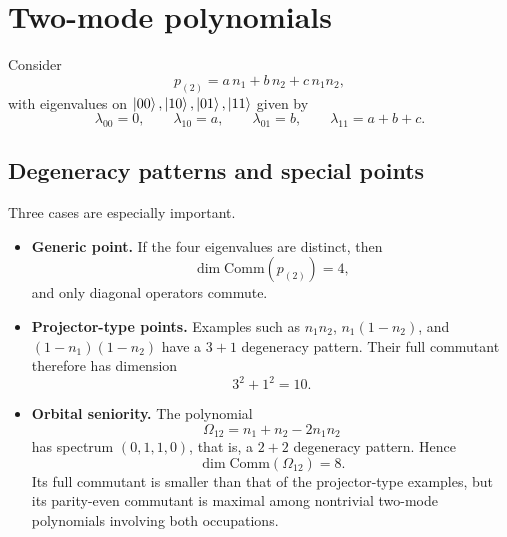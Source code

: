 \documentclass[11pt]{article}
\newcommand{\Comm}{\mathrm{Comm}}
\theoremstyle{definition}
\theoremstyle{remark}
\begin{document}
\section{Two-mode polynomials}
Consider
\begin{equation}
  p_{(2)}=a\,n_1+b\,n_2+c\,n_1n_2,
\end{equation}
with eigenvalues on $\ket{00},\ket{10},\ket{01},\ket{11}$ given by
\begin{equation}
  \lambda_{00}=0,
  \qquad
  \lambda_{10}=a,
  \qquad
  \lambda_{01}=b,
  \qquad
  \lambda_{11}=a+b+c.
\end{equation}

\subsection{Degeneracy patterns and special points}
Three cases are especially important.
\begin{itemize}[leftmargin=2em]
  \item \textbf{Generic point.} If the four eigenvalues are distinct, then
  \begin{equation}
    \dim \Comm(p_{(2)})=4,
  \end{equation}
  and only diagonal operators commute.

  \item \textbf{Projector-type points.} Examples such as $n_1n_2$, $n_1(1-n_2)$, and $(1-n_1)(1-n_2)$ have a $3+1$ degeneracy pattern. Their full commutant therefore has dimension
  \begin{equation}
    3^2+1^2=10.
  \end{equation}

  \item \textbf{Orbital seniority.} The polynomial
  \begin{equation}
    \Omega_{12}=n_1+n_2-2n_1n_2
  \end{equation}
  has spectrum $(0,1,1,0)$, that is, a $2+2$ degeneracy pattern. Hence
  \begin{equation}
    \dim \Comm(\Omega_{12})=8.
  \end{equation}
  Its full commutant is smaller than that of the projector-type examples, but its parity-even commutant is maximal among nontrivial two-mode polynomials involving both occupations.
\end{itemize}
\end{document}
